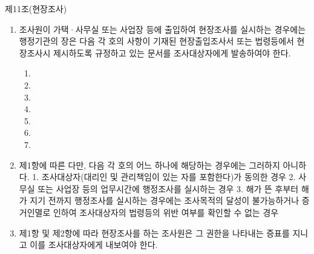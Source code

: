제11조(현장조사)
\begin{enumerate}[①]\tightlist
\item 조사원이 가택·사무실 또는 사업장 등에 출입하여 현장조사를 실시하는 경우에는 행정기관의 장은 다음 각 호의 사항이 기재된 현장출입조사서 또는 법령등에서 현장조사시 제시하도록 규정하고 있는 문서를 조사대상자에게 발송하여야 한다.
	\begin{enumerate}[1.]\tightlist
	\item {}
	\item {}
	\item {}
	\item {}
	\item {}
	\item {}
	\item {}
	\end{enumerate}
\item 제1항에 따른  다만, 다음 각 호의 어느 하나에 해당하는 경우에는 그러하지 아니하다.
  1. 조사대상자(대리인 및 관리책임이 있는 자를 포함한다)가 동의한 경우
  2. 사무실 또는 사업장 등의 업무시간에 행정조사를 실시하는 경우
  3. 해가 뜬 후부터 해가 지기 전까지 행정조사를 실시하는 경우에는 조사목적의 달성이 불가능하거나 증거인멸로 인하여 조사대상자의 법령등의 위반 여부를 확인할 수 없는 경우
\item 제1항 및 제2항에 따라 현장조사를 하는 조사원은 그 권한을 나타내는 증표를 지니고 이를 조사대상자에게 내보여야 한다.
\end{enumerate}

